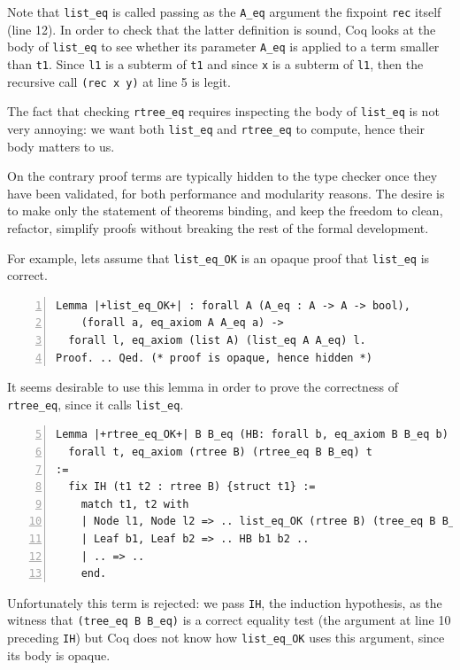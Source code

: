 \documentclass[a4paper,UKenglish,cleveref, autoref]{lipics-v2019}
\begin{document}
\noindent
Note that \lstinline+list_eq+ is called passing as the \lstinline+A_eq+
argument the fixpoint \lstinline+rec+ itself (line 12). In order to
check that the latter definition is sound, Coq looks at the body of
\lstinline+list_eq+ to see whether its parameter \lstinline+A_eq+ is
applied to a term smaller than \lstinline+t1+. Since
\lstinline+l1+ is a subterm of \lstinline+t1+ and since \lstinline+x+
is a subterm of \lstinline+l1+, then the recursive call
\lstinline+(rec x y)+ at line 5 is legit.

The fact that checking \lstinline+rtree_eq+ requires
inspecting the body of \lstinline+list_eq+ is not very annoying:
we want both \lstinline+list_eq+
and \lstinline+rtree_eq+ to compute, hence their body matters to us.

On the contrary proof terms are typically hidden to the type checker once
they have been validated, for both performance and modularity reasons.
The desire is to make only the statement of theorems binding, and keep
the freedom to clean, refactor, simplify proofs without breaking
the rest of the formal development. 

For example, lets assume that \lstinline+list_eq_OK+ is an opaque
proof that \lstinline+list_eq+ is correct.
\begin{lstlisting}[numbers=left]
Lemma |+list_eq_OK+| : forall A (A_eq : A -> A -> bool),
    (forall a, eq_axiom A A_eq a) ->
  forall l, eq_axiom (list A) (list_eq A A_eq) l.
Proof. .. Qed. (* proof is opaque, hence hidden *)
\end{lstlisting}

\noindent
It seems desirable to use this lemma in order to prove the
correctness of \lstinline+rtree_eq+, since it calls
\lstinline+list_eq+.
\begin{lstlisting}[numbers=left,firstnumber=5]
Lemma |+rtree_eq_OK+| B B_eq (HB: forall b, eq_axiom B B_eq b) :
  forall t, eq_axiom (rtree B) (rtree_eq B B_eq) t
:= 
  fix IH (t1 t2 : rtree B) {struct t1} :=
    match t1, t2 with
    | Node l1, Node l2 => .. list_eq_OK (rtree B) (tree_eq B B_eq) IH l1 l2 ..
    | Leaf b1, Leaf b2 => .. HB b1 b2 ..
    | .. => ..
    end.
\end{lstlisting}

\noindent
Unfortunately this term is rejected: we
pass \lstinline+IH+, the induction hypothesis, as the
witness that \lstinline+(tree_eq B B_eq)+ is a correct equality test
(the argument at line 10 preceding \lstinline+IH+) but Coq does not
know how 
\lstinline+list_eq_OK+ uses this argument, since its body is opaque.
\end{document}
